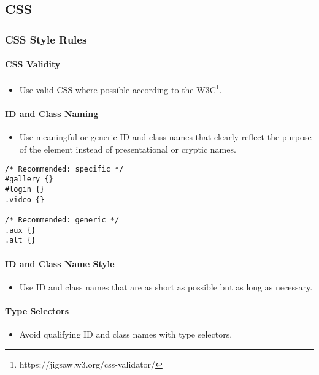 \documentclass[a4paper, 11pt]{article}
\begin{document}
\pagebreak

\subsection{CSS}

\subsubsection{CSS Style Rules}

\paragraph{CSS Validity}
\begin{itemize}
\item Use valid CSS where possible according to the W3C\footnote{https://jigsaw.w3.org/css-validator/}.
\end{itemize}

\paragraph{ID and Class Naming}
\begin{itemize}
\item Use meaningful or generic ID and class names that clearly reflect the purpose of the element instead of presentational or cryptic names.
\end{itemize}
\begin{verbatim}
/* Recommended: specific */
#gallery {}
#login {}
.video {}

/* Recommended: generic */
.aux {}
.alt {}
\end{verbatim}

\paragraph{ID and Class Name Style}
\begin{itemize}
\item Use ID and class names that are as short as possible but as long as necessary.
\end{itemize}

\paragraph{Type Selectors}
\begin{itemize}
\item Avoid qualifying ID and class names with type selectors.
\end{itemize}
\end{document}
